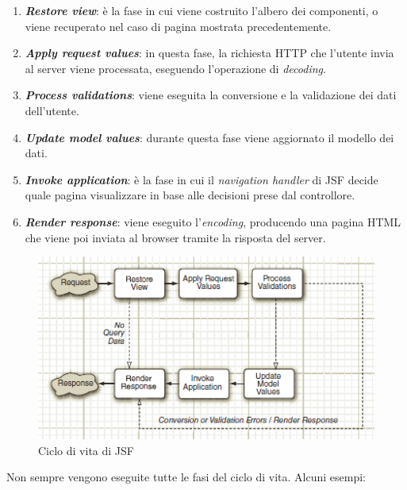 \begin{enumerate}
\item \textbf{\textit{Restore view}}: è la fase in cui viene costruito l'albero dei componenti, o viene recuperato nel caso di pagina mostrata precedentemente.
\item \textbf{\textit{Apply request values}}: in questa fase, la richiesta HTTP che l'utente invia al server viene processata, eseguendo l'operazione di \textit{decoding}.
\item \textbf{\textit{Process validations}}: viene eseguita la conversione e la validazione dei dati dell'utente.
\item \textbf{\textit{Update model values}}: durante questa fase viene aggiornato il modello dei dati.
\item \textbf{\textit{Invoke application}}: è la fase in cui il \textit{navigation handler} di JSF decide quale pagina visualizzare in base alle decisioni prese dal controllore.
\item \textbf{\textit{Render response}}: viene eseguito l'\textit{encoding}, producendo una pagina HTML che viene poi inviata al browser tramite la risposta del server.
\end{enumerate}

\begin{figure}
	\centering
	\includegraphics{JSF_life_cycle.png}
	\caption{Ciclo di vita di JSF}
	\label{jsf_lifecycle}
\end{figure}

Non sempre vengono eseguite tutte le fasi del ciclo di vita. Alcuni esempi:

